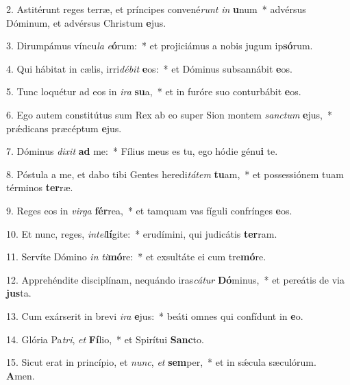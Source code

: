 2. Astitérunt reges terræ, et príncipes convené\textit{runt} \textit{in} \textbf{u}num~*  advérsus Dóminum, et advérsus Christum \textbf{e}jus.\

3. Dirumpámus víncu\textit{la} \textit{e}\textbf{ó}rum:~*  et projiciámus a nobis jugum ip\textbf{só}rum.\

4. Qui hábitat in cælis, irri\textit{dé}\textit{bit} \textbf{e}os:~*  et Dóminus subsannábit \textbf{e}os.\

5. Tunc loquétur ad eos in \textit{i}\textit{ra} \textbf{su}a,~*  et in furóre suo conturbábit \textbf{e}os.\

6. Ego autem constitútus sum Rex ab eo super Sion montem \textit{sanc}\textit{tum} \textbf{e}jus,~*  prǽdicans præcéptum \textbf{e}jus.\

7. Dóminus \textit{di}\textit{xit} \textbf{ad} me:~*  Fílius meus es tu, ego hódie génu\textbf{i} te.\

8. Póstula a me, et dabo tibi Gentes heredi\textit{tá}\textit{tem} \textbf{tu}am,~*  et possessiónem tuam términos \textbf{ter}ræ.\

9. Reges eos in \textit{vir}\textit{ga} \textbf{fér}rea,~*  et tamquam vas fíguli confrínges \textbf{e}os.\

10. Et nunc, reges, \textit{in}\textit{tel}\textbf{lí}gite:~*  erudímini, qui judicátis \textbf{ter}ram.\

11. Servíte Dómino \textit{in} \textit{ti}\textbf{mó}re:~*  et exsultáte ei cum tre\textbf{mó}re.\

12. Apprehéndite disciplínam, nequándo iras\textit{cá}\textit{tur} \textbf{Dó}minus,~*  et pereátis de via \textbf{jus}ta.\

13. Cum exárserit in brevi \textit{i}\textit{ra} \textbf{e}jus:~*  beáti omnes qui confídunt in \textbf{e}o.\

14. Glória Pa\textit{tri}, \textit{et} \textbf{Fí}lio,~*  et Spirítui \textbf{Sanc}to.\

15. Sicut erat in princípio, et \textit{nunc}, \textit{et} \textbf{sem}per,~*  et in sǽcula sæculórum. \textbf{A}men.\

